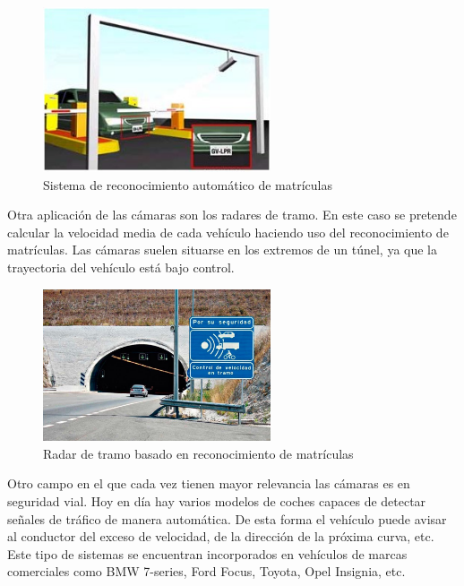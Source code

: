 \begin{figure}[H]
  \begin{center}
    \includegraphics[width=0.6\textwidth]{figures/Introduccion/reconocimiento_matriculas.jpeg}
		\caption{Sistema de reconocimiento automático de matrículas}
		\label{fig.reconocimiento_matriculas}
		\end{center}
\end{figure}

Otra aplicación de las cámaras son los radares de tramo. En este caso se pretende calcular la velocidad media de cada vehículo haciendo uso del reconocimiento de matrículas. Las cámaras suelen situarse en los extremos de un túnel, ya que la trayectoria del vehículo está bajo control.

\begin{figure}[H]
  \begin{center}
    \includegraphics[width=0.6\textwidth]{figures/Introduccion/radartramo.jpg}
		\caption{Radar de tramo basado en reconocimiento de matrículas}
		\label{fig.radartramo}
		\end{center}
\end{figure}

Otro campo en el que cada vez tienen mayor relevancia las cámaras es en seguridad vial. Hoy en día hay varios modelos de coches capaces de detectar señales de tráfico de manera automática. De esta forma el vehículo puede avisar al conductor del exceso de velocidad, de la dirección de la próxima curva, etc. Este tipo de sistemas se encuentran incorporados en vehículos de marcas comerciales como BMW 7-series, Ford Focus, Toyota, Opel Insignia, etc.

